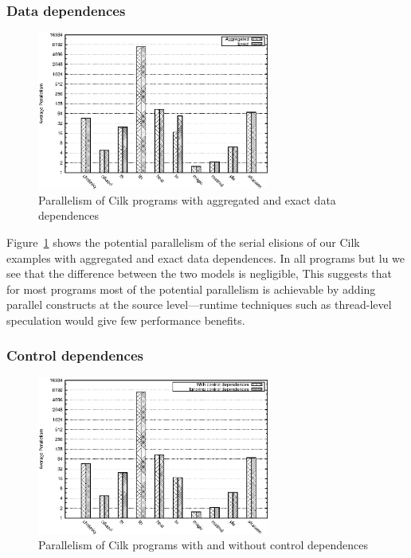 \subsubsection{Data dependences}

\begin{figure}
 \centering
 \includegraphics[width=3in]{cilk-data}
 \caption{Parallelism of Cilk programs with aggregated and exact data dependences}
 \label{cilk-data}
\end{figure}

Figure~\ref{cilk-data} shows the potential parallelism of the serial elisions of our Cilk examples with aggregated and exact data dependences.
In all programs but lu we see that the difference between the two models is negligible,
This suggests that for most programs most of the potential parallelism is achievable by adding parallel constructs at the source level---runtime techniques such as thread-level speculation would give few performance benefits.

\subsubsection{Control dependences}

\begin{figure}
 \centering
 \includegraphics[width=3in]{cilk-ctl}
 \caption{Parallelism of Cilk programs with and without control dependences}
 \label{cilk-ctl}
\end{figure}

